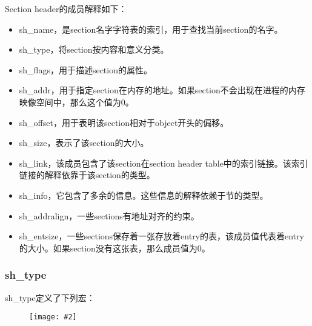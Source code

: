 \documentclass[a4paper,left=2.5cm,right=2.5cm,11pt]{article}
\newcommand{\sizedfic}[2]{\begin{figure}[H]
		\center
		\texttt{[image: \#2]}
	\end{figure}}
\begin{document}
	Section header的成员解释如下：
	\begin{itemize}
		\item sh\_name，是section名字字符表的索引，用于查找当前section的名字。
		\item sh\_type，将section按内容和意义分类。
		\item sh\_flags，用于描述section的属性。
		\item sh\_addr，用于指定section在内存的地址。如果section不会出现在进程的内存映像空间中，那么这个值为0。
		\item sh\_offset，用于表明该section相对于object开头的偏移。
		\item sh\_size，表示了该section的大小。
		\item sh\_link，该成员包含了该section在section header table中的索引链接。该索引链接的解释依靠于该section的类型。
		\item sh\_info，它包含了多余的信息。这些信息的解释依赖于节的类型。
		\item sh\_addralign，一些sections有地址对齐的约束。
		\item sh\_entsize，一些sections保存着一张存放着entry的表，该成员值代表着entry的大小。如果section没有这张表，那么成员值为0。
	\end{itemize}

\subsubsection{sh\_type}
	sh\_type定义了下列宏：
	\sizedfic{0.4}{16.png}
\end{document}
